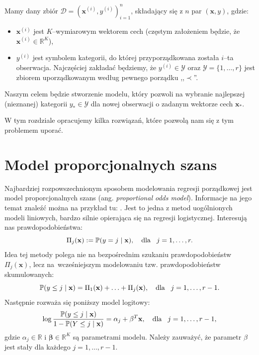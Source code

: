 \documentclass{mini}
\begin{document}
Mamy dany zbiór $\mathcal{D} = (\mathbf{x}^{(i)}, y^{(i)})_{i=1}^n$, składający się z $n$ par $(\mathbf{x}, y)$, gdzie:
\begin{itemize}
\item $\mathbf{x}^{(i)}$ jest $K$--wymiarowym wektorem cech (częstym założeniem będzie, że $\mathbf{x}^{(i)}\in \mathbb{R}^K$),  
\item $y^{(i)}$ jest symbolem kategorii, do której przyporządkowana została $i$--ta obserwacja. Najczęściej zakładać będziemy, że $y^{(i)}\in\mathcal{Y}$ oraz $\mathcal{Y} = \lbrace 1,\ldots ,r \rbrace$ jest zbiorem uporządkowanym według pewnego porządku ,,$\prec$''. 
\end{itemize}
Naszym celem będzie stworzenie modelu, który pozwoli na wybranie najlepszej (nieznanej) kategorii $y_{\ast}\in\mathcal{Y}$ dla nowej obserwacji o zadanym wektorze cech $\mathbf{x}_{\ast}$. 

W tym rozdziale opracujemy kilka rozwiązań, które pozwolą nam się z tym problemem uporać.

\section{Model proporcjonalnych szans}

Najbardziej rozpowszechnionym sposobem modelowania regresji porządkowej jest model proporcjonalnych szans (ang. \textit{proportional odds model}). Informacje na jego temat znaleźć można na przykład tu: \cite{pom}. Jest to jedna z metod uogólnionych modeli liniowych, bardzo silnie opierająca się na regresji logistycznej. Interesują nas prawdopodobieństwa: 
$$
\Pi_j(\mathbf{x}):=\mathbb{P}(y=j\hspace{1mm}|\hspace{1mm}\mathbf{x}),\quad \textrm{dla}\hspace{3mm} j=1,\ldots,r.
$$
Idea tej metody polega nie na bezpośrednim szukaniu prawdopodobieństw $\Pi_j(\mathbf{x})$, lecz na~wcześniejszym modelowaniu tzw. prawdopodobieństw skumulowanych:
$$
\mathbb{P}(y\leq j \hspace{1mm}|\hspace{1mm} \mathbf{x})=\Pi_1(\mathbf{x})+\ldots+\Pi_j(\mathbf{x}),\quad \textrm{dla}\hspace{3mm} j=1,\ldots,r-1.
$$
Następnie rozważa się poniższy model logitowy:
$$
\log\dfrac{\mathbb{P}(y\leq j \hspace{1mm}|\hspace{1mm} \mathbf{x})}{1 - \mathbb{P}(Y\leq j \hspace{1mm}|\hspace{1mm} \mathbf{x})} = \alpha_j+\mathbf{\beta}^T\mathbf{x},\quad \textrm{dla}\hspace{3mm} j=1,\ldots,r-1,
$$
gdzie $\alpha_j\in \mathbb{R}$ i $\mathbf{\beta}\in \mathbb{R}^K$ są parametrami modelu. Należy zauważyć, że parametr $\beta$ jest stały dla każdego $j=1, \ldots, r-1$.
\end{document}
